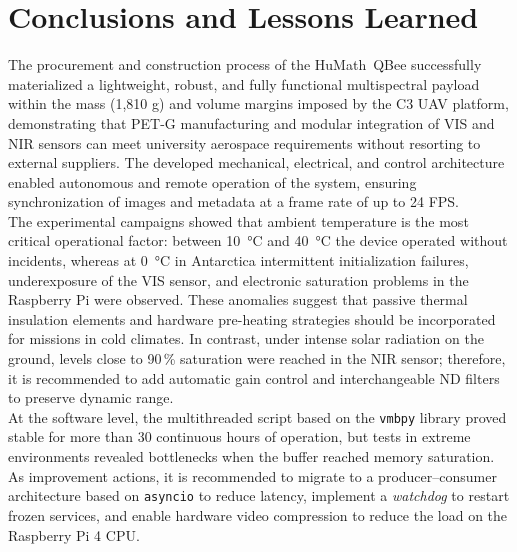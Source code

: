 \section{Conclusions and Lessons Learned}

\noindent The procurement and construction process of the HuMath\textregistered~QBee successfully materialized a lightweight, robust, and fully functional multispectral payload within the mass (1,810 g) and volume margins imposed by the C3 UAV platform, demonstrating that PET-G manufacturing and modular integration of VIS and NIR sensors can meet university aerospace requirements without resorting to external suppliers. The developed mechanical, electrical, and control architecture enabled autonomous and remote operation of the system, ensuring synchronization of images and metadata at a frame rate of up to 24 FPS.\\


\noindent The experimental campaigns showed that ambient temperature is the most critical operational factor: between 10~\si{\celsius} and 40~\si{\celsius} the device operated without incidents, whereas at 0~\si{\celsius} in Antarctica intermittent initialization failures, underexposure of the VIS sensor, and electronic saturation problems in the Raspberry Pi were observed. These anomalies suggest that passive thermal insulation elements and hardware pre-heating strategies should be incorporated for missions in cold climates. In contrast, under intense solar radiation on the ground, levels close to 90\,\% saturation were reached in the NIR sensor; therefore, it is recommended to add automatic gain control and interchangeable ND filters to preserve dynamic range.\\


\noindent At the software level, the multithreaded script based on the \texttt{vmbpy} library proved stable for more than 30 continuous hours of operation, but tests in extreme environments revealed bottlenecks when the buffer reached memory saturation. As improvement actions, it is recommended to migrate to a producer–consumer architecture based on \texttt{asyncio} to reduce latency, implement a \textit{watchdog} to restart frozen services, and enable hardware video compression to reduce the load on the Raspberry Pi 4 CPU.\\

